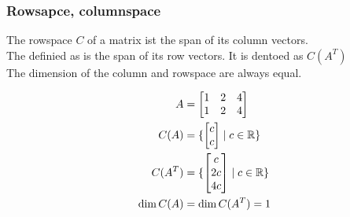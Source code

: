 \subsubsection{Rowsapce, columnspace}
The rowspace \( C \) of a matrix ist the span of its column vectors. \\
The definied as is the span of its row vectors. It is dentoed as \( C(A^T) \)\\
The dimension of the column and rowspace are always equal.
\begin{example}
    \begin{align*}
        A         & = \begin{bmatrix}
            1 & 2 & 4 \\ 1 & 2 & 4
        \end{bmatrix}      \\
        C(A)      & = \{
        \begin{bmatrix}
                c \\ c
            \end{bmatrix} \mid c \in \mathbb{R} \} \\
        C(A^T)    & = \{
        \begin{bmatrix}
                c \\ 2c \\ 4c
            \end{bmatrix} \mid c \in \mathbb{R} \} \\
        \dim C(A) & = \dim C(A^T) = 1                \\
    \end{align*}
\end{example}
